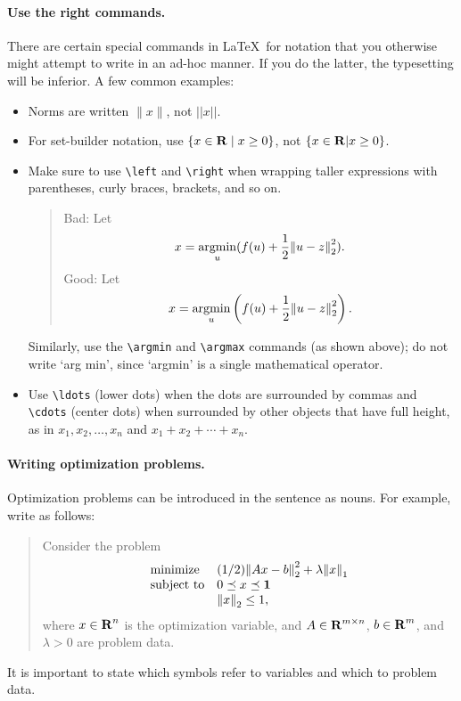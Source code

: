\documentclass{article}
\begin{document}
\paragraph{Use the right commands.}
There are certain special commands in \LaTeX\ for notation that you otherwise might attempt to write in an ad-hoc manner. 
If you do the latter, the typesetting will be inferior. 
A few common examples:
\begin{itemize}
    \item Norms are written $\|x\|$, not $||x||$. 

    \item For set-builder notation, use
        $\{ x \in {\bf R{}} \mid x \geq 0 \}$, not $\{x \in {\bf R{}} | x \geq 0 \}$.

    \item Make sure to use \verb+\left+ and \verb+\right+ when wrapping taller expressions with parentheses, curly braces, brackets, and so on.
    \begin{quote}
        Bad: Let
        \[
            x = \mathop{\rm argmin}_u (f(u) + \frac{1}{2}{\lVert u - z \rVert}_2^2).
        \]
        Good: Let
        \[
            x = \mathop{\rm argmin}_u \left(f(u) + \frac{1}{2}{\lVert u - z \rVert}_2^2\right).
        \]
    \end{quote}
    Similarly, use the \verb+\argmin+ and \verb+\argmax+ commands (as shown above); do not write `arg min', since `argmin' is a single mathematical operator. 

    \item Use \verb+\ldots+ (lower dots) when the dots are surrounded by commas and \verb+\cdots+ (center dots) when surrounded by other objects that have full height, as in $x_1, x_2, \ldots, x_n$ and $x_1 + x_2 + \cdots + x_n$.
\end{itemize}

\paragraph{Writing optimization problems.}
Optimization problems can be introduced in the sentence as nouns. 
For example, write as follows:
\begin{quote}
    Consider the problem
    \begin{equation}
        \begin{array}{ll}
            \mbox{minimize}   & (1/2){\lVert Ax-b \rVert}_2^2 + \lambda {\lVert x \rVert}_1 \\
            \mbox{subject to} & 0 \preceq x \preceq \mathbf{1} \\
            & {\lVert x \rVert}_2 \leq 1,
        \end{array}
        \label{e-opt-prob}
    \end{equation}
    where $x \in {\bf R{}}^n$ is the optimization variable, and $A \in {\bf R{}}^{m \times n}$, $b \in {\bf R{}}^m$, and $\lambda > 0$ are problem data.
\end{quote}
It is important to state which symbols refer to variables and which to problem data.
\end{document}
